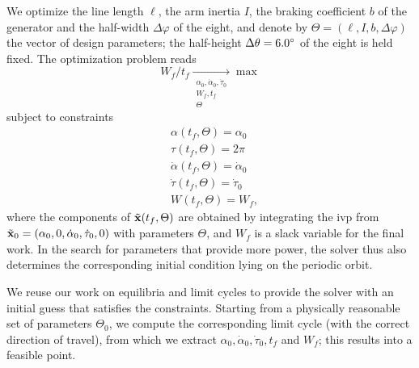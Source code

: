 We optimize the line length \(\ell\), the arm inertia \(I\), the braking coefficient \(b\) of the generator and the half-width \(\Delta\varphi\) of the eight, and denote by \(\Theta = (\ell, I, b, \Delta\varphi)\) the vector of design parameters; the half-height \(\Delta\theta = 6.0^\circ\) of the eight is held fixed.
The optimization problem reads
\begin{equation} \label{eq:opt-problem}
W_f / t_f \underset{\substack{\alpha_0, \dot{\alpha}_0, \dot{\tau}_0 \\ W_f, t_f \\ \Theta}}{\longrightarrow} \max
\end{equation}
subject to constraints
\begin{equation} \label{eq:opt-constraints}
\begin{split}
    &\alpha(t_f, \Theta) = \alpha_0 \\
    &\tau(t_f, \Theta) = 2\pi \\
    &\dot \alpha(t_f, \Theta) = \dot \alpha_0 \\
    &\dot \tau(t_f, \Theta) = \dot \tau_0 \\
    &W(t_f, \Theta) = W_f,
\end{split}
\end{equation}
where the components of \(\tilde{\vb x}(t_f, \Theta)\) are obtained by integrating the \ac{ivp} from \(\tilde{\vb x}_0 = (\alpha_0, 0, \dot \alpha_0, \dot \tau_0, 0)\) with parameters \(\Theta\), and \(W_f\) is a slack variable for the final work.
In the search for parameters that provide more power, the solver thus also determines the corresponding initial condition lying on the periodic orbit.

We reuse our work on equilibria and limit cycles to provide the solver with an initial guess that satisfies the constraints.
Starting from a physically reasonable set of parameters \(\Theta_0\), we compute the corresponding limit cycle (with the correct direction of travel), from which we extract \(\alpha_0, \dot \alpha_0, \dot \tau_0, t_f\) and \(W_f\); this results into a feasible point.


